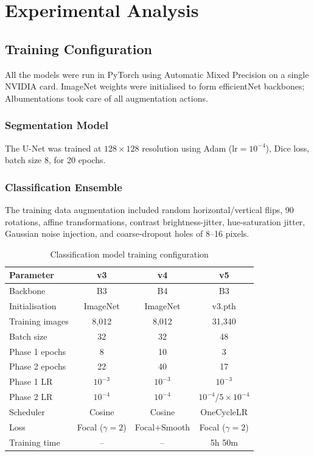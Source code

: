 \documentclass[conference]{IEEEtran}
\begin{document}
\section{Experimental Analysis}
\label{sec:experiments}

\subsection{Training Configuration}

All the models were run in PyTorch using Automatic Mixed Precision on a single NVIDIA card. ImageNet weights were initialised to form efficientNet backbones; Albumentations took care of all augmentation actions.

\subsubsection{Segmentation Model}
The U-Net was trained at $128{\times}128$ resolution using Adam ($\text{lr}=10^{-4}$), Dice loss, batch size 8, for 20 epochs.

\subsubsection{Classification Ensemble}

The training data augmentation included random horizontal/vertical flips, 90\textdegree{} rotations, affine transformations, contrast brightness-jitter, hue-saturation jitter, Gaussian noise injection, and coarse-dropout holes of 8--16 pixels.

\begin{table}[h]
\centering
\caption{Classification model training configuration}
\label{tab:cls_config}
\begin{tabular}{lccc}
\hline
Parameter & v3 & v4 & v5 \\
\hline
Backbone & B3 & B4 & B3 \\
Initialisation & ImageNet & ImageNet & v3.pth \\
Training images & 8,012 & 8,012 & 31,340 \\
Batch size & 32 & 32 & 48 \\
Phase 1 epochs & 8 & 10 & 3 \\
Phase 2 epochs & 22 & 40 & 17 \\
Phase 1 LR & $10^{-3}$ & $10^{-3}$ & $10^{-3}$ \\
Phase 2 LR & $10^{-4}$ & $10^{-4}$ & $10^{-4}$/$5{\times}10^{-4}$ \\
Scheduler & Cosine & Cosine & OneCycleLR \\
Loss & Focal ($\gamma{=}2$) & Focal+Smooth & Focal ($\gamma{=}2$) \\
Training time & -- & -- & 5h 50m \\
\hline
\end{tabular}
\end{table}
\end{document}
